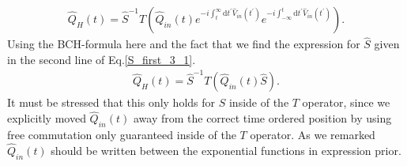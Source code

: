 \documentclass[12pt, titlepage]{article}
\begin{document}
 \begin{equation}
\begin{split}
\hat{Q}_{H}(t)
=
\hat{S}^{-1} 
T
\left( 
\hat{Q}_{in}(t)
 e^{-i\int_{t}^{\infty}\mathrm{d}t^{\prime} \hat{V}_{in}(t^{\prime})}
 e^{-i\int_{-\infty}^{t}\mathrm{d}t^{\prime} \hat{V}_{in}(t^{\prime})}
\right) 
.
\end{split}
\end{equation}
Using the BCH-formula here and the fact that we find the expression for $ \hat{S} $ given in the second line of Eq.\enskip\eqref{S_first_3_1}. 
 \begin{equation}
\begin{split}
\hat{Q}_{H}(t)
=
\hat{S}^{-1} 
T
\left( 
\hat{Q}_{in}(t)
\hat{S}
\right) 
.
\end{split}
\end{equation}
It must be stressed that this only holds for $ \hat{S} $ inside of the $ T $ operator, since we explicitly moved $ \hat{Q}_{in}(t) $ away from the correct time ordered position by using free commutation only guaranteed inside of the $ T $ operator. As we remarked $ \hat{Q}_{in}(t) $ should be written between the exponential functions in expression prior.
\end{document}
